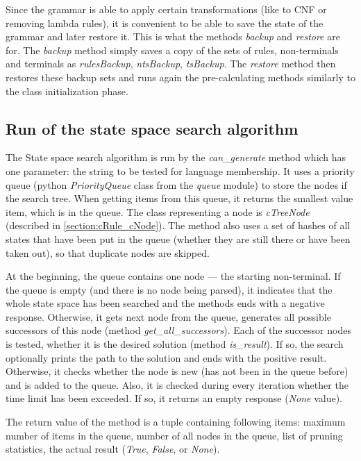 Since the grammar is able to apply certain transformations (like to CNF or removing lambda rules), it is convenient to be able to save the state of the grammar and later restore it. This is what the methods \textit{backup} and \textit{restore} are for. The \textit{backup} method simply saves a copy of the sets of rules, non-terminals and terminals as \textit{rulesBackup}, \textit{ntsBackup}, \textit{tsBackup}. The \textit{restore} method then restores these backup sets and runs again the pre-calculating methods similarly to the class initialization phase.

\subsection{Run of the state space search algorithm}
The State space search algorithm is run by the \textit{can\_generate} method which has one parameter: the string to be tested for language membership. It uses a priority queue (python \textit{PriorityQueue} class from the \textit{queue} module) to store the nodes if the search tree. When getting items from this queue, it returns the smallest value item, which is in the queue. The class representing a node is \textit{cTreeNode} (described in \ref{section:cRule_cNode}). The method also uses a set of hashes of all states that have been put in the queue (whether they are still there or have been taken out), so that duplicate nodes are skipped.

At the beginning, the queue contains one node --- the starting non-terminal. If the queue is empty (and there is no node being parsed), it indicates that the whole state space has been searched and the methods ends with a negative response. Otherwise, it gets next node from the queue, generates all possible successors of this node (method \textit{get\_all\_successors}). Each of the successor nodes is tested, whether it is the desired solution (method \textit{is\_result}). If so, the search optionally prints the path to the solution and ends with the positive result. Otherwise, it checks whether the node is new (has not been in the queue before) and is added to the queue. Also, it is checked during every iteration whether the time limit has been exceeded. If so, it returns an empty response (\textit{None} value).

The return value of the method is a tuple containing following items: maximum number of items in the queue, number of all nodes in the queue, list of pruning statistics, the actual result (\textit{True}, \textit{False}, or \textit{None}).

